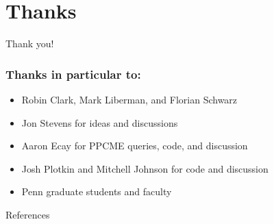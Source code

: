 \documentclass[compress]{beamer}
\begin{document}
\appendix

\section{Thanks}

\begin{frame}
\begin{center}
\huge Thank you!
\end{center}
\end{frame}

\begin{frame}
\frametitle{Thanks in particular to:}
\begin{center}
	\begin{itemize}
		\item Robin Clark, Mark Liberman, and Florian Schwarz
		\item Jon Stevens for ideas and discussions
		\item Aaron Ecay for PPCME queries, code, and discussion
		\item Josh Plotkin and Mitchell Johnson for code and discussion
		\item Penn graduate students and faculty
	\end{itemize}
\end{center}
\end{frame}


%


\begin{frame}[allowframebreaks]{References}
\printbibliography
\end{frame}
\end{document}
